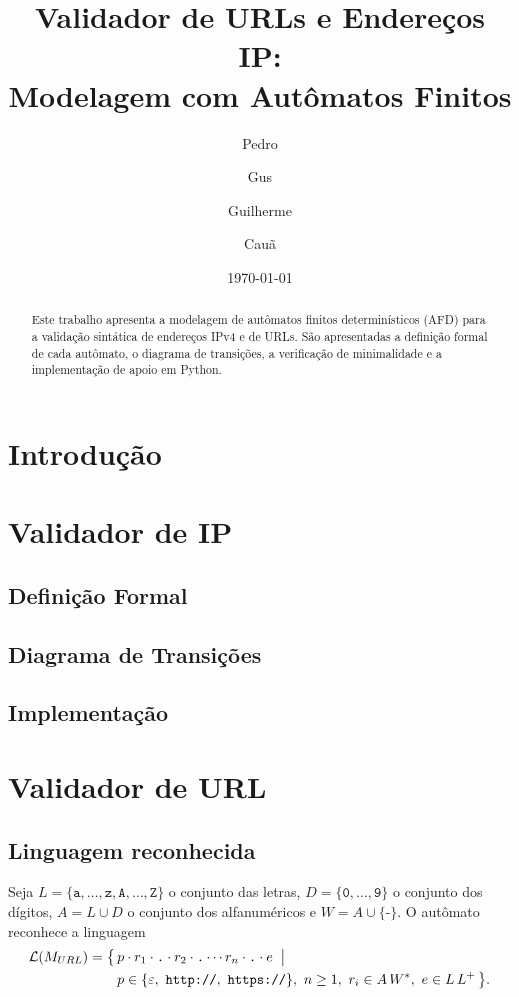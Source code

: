 \documentclass[12pt]{article}
\title{Validador de URLs e Endereços IP: \\ Modelagem com Autômatos Finitos}
\author{Pedro \and Gus \and Guilherme \and Cauã}
\date{\today}
\begin{document}
\maketitle

\begin{abstract}
Este trabalho apresenta a modelagem de autômatos finitos determinísticos (AFD)
para a validação sintática de endereços IPv4 e de URLs. São apresentadas a
definição formal de cada autômato, o diagrama de transições, a verificação de
minimalidade e a implementação de apoio em Python.
\end{abstract}

\section{Introdução}

\section{Validador de IP}
\subsection{Definição Formal}
\subsection{Diagrama de Transições}
\subsection{Implementação}

\section{Validador de URL}

\subsection{Linguagem reconhecida}
Seja $L = \{\texttt{a},\dots,\texttt{z},\texttt{A},\dots,\texttt{Z}\}$ o conjunto
das letras, $D = \{\texttt{0},\dots,\texttt{9}\}$ o conjunto dos dígitos,
$A = L \cup D$ o conjunto dos alfanuméricos e $W = A \cup \{\texttt{-}\}$.
O autômato reconhece a linguagem
\begin{align*}
  \mathcal{L}(M_{URL}) = \bigl\{\, & p \cdot r_1 \cdot \texttt{.} \cdot r_2 \cdot \texttt{.}
  \cdots r_n \cdot \texttt{.} \cdot e \;\bigm| \\
  & p \in \{\varepsilon,\ \texttt{http://},\ \texttt{https://}\},\
  n \geq 1,\ r_i \in A\,W^{*},\ e \in L\,L^{+} \,\bigr\}.
\end{align*}
\end{document}
